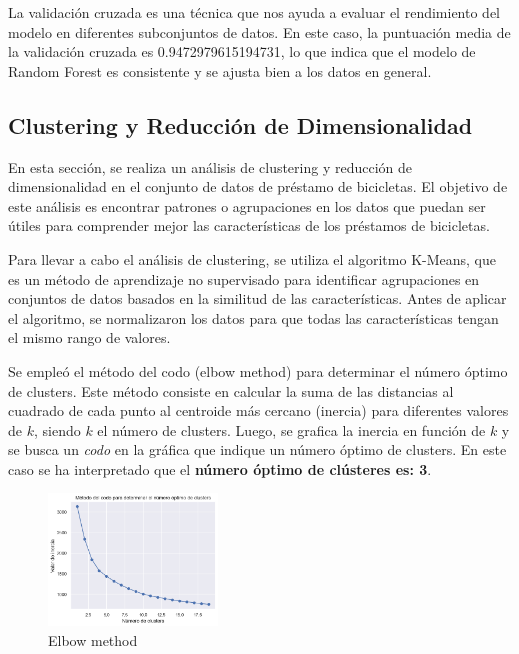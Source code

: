 \documentclass{wsdcr}
\begin{document}
La validación cruzada es una técnica que nos ayuda a evaluar el rendimiento del modelo en diferentes subconjuntos de datos. En este caso, la puntuación media de la validación cruzada es 0.9472979615194731, lo que indica que el modelo de Random Forest es consistente y se ajusta bien a los datos en general.

\subsection{Clustering y Reducción de Dimensionalidad}

En esta sección, se realiza un análisis de clustering y reducción de dimensionalidad en el conjunto de datos de préstamo de bicicletas. El objetivo de este análisis es encontrar patrones o agrupaciones en los datos que puedan ser útiles para comprender mejor las características de los préstamos de bicicletas.

Para llevar a cabo el análisis de clustering, se utiliza el algoritmo K-Means, que es un método de aprendizaje no supervisado para identificar agrupaciones en conjuntos de datos basados en la similitud de las características. Antes de aplicar el algoritmo, se normalizaron los datos para que todas las características tengan el mismo rango de valores.

Se empleó el método del codo (elbow method) para determinar el número óptimo de clusters. Este método consiste en calcular la suma de las distancias al cuadrado de cada punto al centroide más cercano (inercia) para diferentes valores de $k$, siendo $k$ el número de clusters. Luego, se grafica la inercia en función de $k$ y se busca un \textit{codo} en la gráfica que indique un número óptimo de clusters. En este caso se ha interpretado que el \textbf{número óptimo de clústeres es: 3}.

\begin{figure}[h]
    \centering
    \includegraphics[width=0.4\textwidth]{charts/elbow_method_optimum_value.png}
    \caption{Elbow method}
    \label{fig:elbowmethod}
\end{figure}
\end{document}
